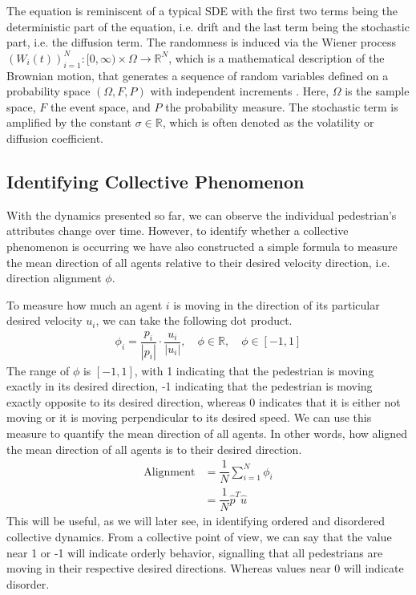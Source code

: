 The equation is reminiscent of a typical SDE with the first two terms being the deterministic part of the equation, i.e. drift and the last term being the stochastic part, i.e. the diffusion term. The randomness is induced via the Wiener process $(W_i(t))^N_{i=1}: [0,\infty) \times \Omega \rightarrow \mathbb{R}^N$, which is a mathematical description of the Brownian motion, that generates a sequence of random variables defined on a probability space $(\Omega, F, P)$ with independent increments \cite{oksendal2003stochastic}. Here, $\Omega$ is the sample space, $F$ the event space, and $P$ the probability measure. The stochastic term is amplified by the constant $\sigma \in \mathbb{R}$, which is often denoted as the volatility or diffusion coefficient.


\subsection{Identifying Collective Phenomenon}
With the dynamics presented so far, we can observe the individual pedestrian's attributes change over time. However, to identify whether a collective phenomenon is occurring we have also constructed a simple formula to measure the mean direction of all agents relative to their desired velocity direction, i.e. direction alignment $\phi$.

To measure how much an agent $i$ is moving in the direction of its particular desired velocity $u_i$, we can take the following dot product.
\begin{gather}
    \phi_i = \dfrac{p_i}{|p_i|} \cdot \dfrac{u_i}{|u_i|}, \quad \phi \in \mathbb{R}, \quad \phi \in [-1,1]
\end{gather}
The range of $\phi$ is $[-1, 1]$, with 1 indicating that the pedestrian is moving exactly in its desired direction, -1 indicating that the pedestrian is moving exactly opposite to its desired direction, whereas 0 indicates that it is either not moving or it is moving perpendicular to its desired speed. We can use this measure to quantify the mean direction of all agents. In other words, how aligned the mean direction of all agents is to their desired direction.
\begin{align}
    \text{Alignment} &= \dfrac{1}{N}\sum_{i=1}^N \phi_i \nonumber \\
    &= \dfrac{1}{N}\hat p^T \hat u
    \label{eq:alignment}
\end{align}
This will be useful, as we will later see, in identifying ordered and disordered collective dynamics. From a collective point of view, we can say that the value near 1 or -1 will indicate orderly behavior, signalling that all pedestrians are moving in their respective desired directions. Whereas values near 0 will indicate disorder.

